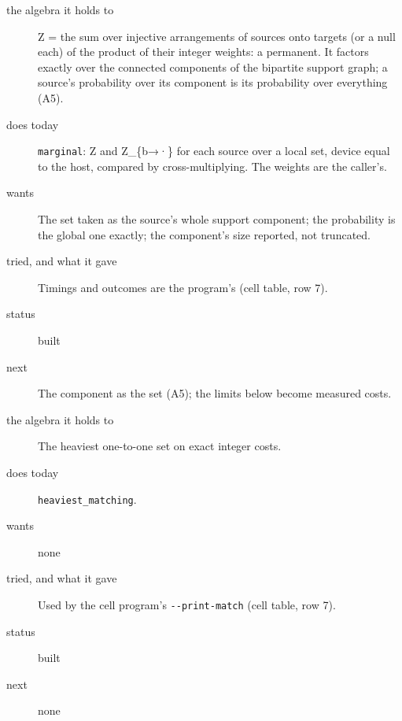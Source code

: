 \begin{description}
\item[{the algebra it holds to}] Z = the sum over injective arrangements of sources onto targets (or a null each) of the product of their integer weights: a permanent. It factors exactly over the connected components of the bipartite support graph; a source's probability over its component is its probability over everything (A5).
\item[{does today}] \texttt{marginal}: Z and Z\_\allowbreak{}\{b→·\} for each source over a local set, device equal to the host, compared by cross-multiplying. The weights are the caller's.
\item[{wants}] The set taken as the source's whole support component; the probability is the global one exactly; the component's size reported, not truncated.
\item[{tried, and what it gave}] Timings and outcomes are the program's (cell table, row 7).
\item[{status}] built
\item[{next}] The component as the set (A5); the limits below become measured costs.
\end{description}

\begin{description}
\item[{the algebra it holds to}] The heaviest one-to-one set on exact integer costs.
\item[{does today}] \texttt{heaviest\_\allowbreak{}matching}.
\item[{wants}] none
\item[{tried, and what it gave}] Used by the cell program's \texttt{-\allowbreak{}-\allowbreak{}print-\allowbreak{}match} (cell table, row 7).
\item[{status}] built
\item[{next}] none
\end{description}

